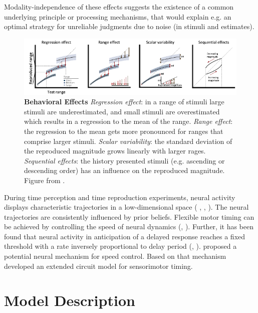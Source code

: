 \documentclass[10pt]{article}
\begin{document}
Modality-independence of these effects suggests the existence of a common underlying principle or processing mechanisms, that would explain e.g. an optimal strategy for unreliable judgments due to noise (in stimuli and estimates).

\begin{figure}[ht]
	\centering
	\includegraphics[width=\textwidth]{figures/behavioural_effects_petzschner.pdf}
	\caption{\textbf{Behavioral Effects} 
	\textit{Regression effect}: in a range of stimuli large stimuli are underestimated, and small stimuli are overestimated which results in a regression to the mean of the range.
	\textit{Range effect}: the regression to the mean gets more pronounced for ranges that comprise larger stimuli. 
	\textit{Scalar variability}: the standard deviation of the reproduced magnitude grows linearly with larger rages. 
	\textit{Sequential effects}: the history presented stimuli (e.g. ascending or descending order) has an influence on the reproduced magnitude. 
	Figure from \cite{Petzschner2015}.}
	\label{fig:behavioraleffects}
\end{figure}

During time perception and time reproduction experiments, neural activity displays characteristic trajectories in a low-dimensional space ( \cite{Wang2018}, \cite{Henke2021}, \cite{Meirhaeghe2021}). 
The neural trajectories are consistently influenced by prior beliefs. 
Flexible motor timing can be achieved by controlling the speed of neural dynamics (\cite{Sohn2019}, \cite{Wang2018}). 
Further, it has been found that neural activity in anticipation of a delayed response reaches a fixed threshold with a rate inversely proportional to delay period (\cite{Murakami2014}, \cite{Mita2009}).
\cite{Wang2018} proposed a potential neural mechanism for speed control. Based on that mechanism \cite{Egger2020} developed an extended circuit model for sensorimotor timing.

\section{Model Description}
\end{document}
